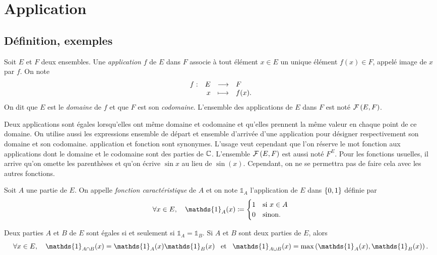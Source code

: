 \documentclass{magnolia}
\begin{document}
\section{Application}

\subsection{Définition, exemples}
\begin{definition}[utile=-3]
Soit $E$ et $F$ deux ensembles. Une \emph{application} $f$ de $E$ dans $F$ associe
à tout élément $x\in E$ un unique élément $f(x)\in F$, appelé image de $x$ par
$f$. On note
\[\begin{array}[t]{lrcl} \displaystyle{f} : & \displaystyle{E} & \longrightarrow & \displaystyle{F} \\ & \displaystyle{x} & \longmapsto & \displaystyle{f(x).} \end{array}\]
On dit que $E$ est le \emph{domaine} de $f$ et que $F$ est son \emph{codomaine}. L'ensemble des
applications de $E$ dans $F$ est noté $\mathcal{F}\left(E,F\right)$.
\end{definition}


\begin{remarques}
\remarque Deux applications sont égales lorsqu'elles ont même domaine et codomaine et qu'elles prennent la
  même valeur en chaque point de ce domaine.
\remarque On utilise aussi les expressions \og ensemble de départ \fg et \og ensemble d'arrivée \fg
  d'une application pour désigner respectivement son domaine et son codomaine.
\remarque \og application \fg et \og fonction \fg sont synonymes. L'usage veut cependant que l'on
  réserve le mot \og fonction \fg aux applications dont le domaine et le codomaine sont des parties de $\mathbb{C}$.
\remarque L'ensemble $\mathcal{F}\left(E,F\right)$ est aussi noté $F^E$.
\remarque Pour les fonctions usuelles, il arrive qu'on omette les parenthèses et
  qu'on écrive $\sin x$ au lieu de $\sin(x)$. Cependant, on ne se permettra pas de faire cela avec les
  autres fonctions.
\end{remarques}

\begin{definition}
Soit $A$ une partie de $E$. On appelle \emph{fonction caractéristique} de $A$ et on note $\mathds{1}_A$ l'application de $E$ dans $\left\{0,1\right\}$ définie
par
  \[\forall x\in E \qsep \mathds{1}_A(x)\defeq
    \begin{cases}
    1 & \text{si $x\in A$}\\
    0 & \text{sinon.}
    \end{cases}\]
\end{definition}

\begin{remarques}
\remarque Deux parties $A$ et $B$ de $E$ sont égales si et seulement si $\mathds{1}_{A}=\mathds{1}_{B}$.
\remarque Si $A$ et $B$ sont deux parties de $E$, alors
  \[\forall x\in E\qsep \mathds{1}_{A\cap B}(x)=\mathds{1}_{A}(x)\mathds{1}_{B}(x) \et \mathds{1}_{A\cup B}(x)=\max\p{\mathds{1}_{A}(x), \mathds{1}_{B}(x)}.\]
\end{remarques}
\end{document}
